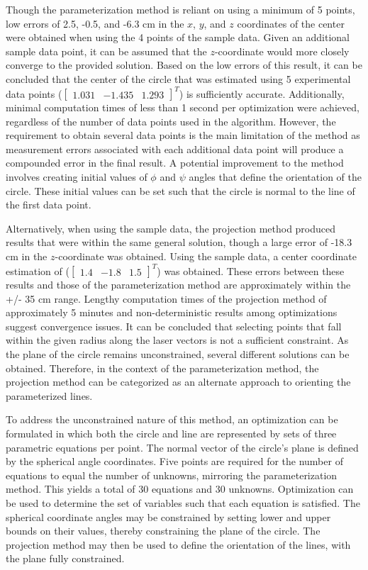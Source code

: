 \documentclass[12pt]{article}
\begin{document}
Though the parameterization method is reliant on using a minimum of 5 points, low errors of 2.5, -0.5, and -6.3 cm in the $x$,  $y$, and $z$ coordinates of the center were obtained when using the 4 points of the sample data.  Given an additional sample data point, it can be assumed that the $z$-coordinate would more closely converge to the provided solution.  Based on the low errors of this result, it can be concluded that the center of the circle that was estimated using 5 experimental data points ($\begin{bmatrix} 1.031 & -1.435  & 1.293 \end{bmatrix}^T$) is sufficiently accurate. Additionally, minimal computation times of less than 1 second per optimization were achieved, regardless of the number of data points used in the algorithm. However, the requirement to obtain several data points is the main limitation of the method as measurement errors associated with each additional data point will produce a compounded error in the final result. A potential improvement to the method involves creating initial values of $\phi$ and $\psi$ angles that define the orientation of the circle.  These initial values can be set such that the circle is normal to the line of the first data point.  

Alternatively, when using the sample data, the projection method produced results that were within the same general solution, though a large error of -18.3 cm in the $z$-coordinate was obtained. Using the sample data, a center coordinate estimation of ($\begin{bmatrix} 1.4 & -1.8  & 1.5 \end{bmatrix}^T$) was obtained. These errors between these results and those of the parameterization method are approximately within the +/- 35 cm range. Lengthy computation times of the projection method of approximately 5 minutes and non-deterministic results among optimizations suggest convergence issues. It can be concluded that selecting points that fall within the given radius along the laser vectors is not a sufficient constraint. As the plane of the circle remains unconstrained, several different solutions can be obtained. Therefore, in the context of the parameterization method, the projection method can be categorized as an alternate approach to orienting the parameterized lines.

To address the unconstrained nature of this method, an optimization can be formulated in which both the circle and line are represented by sets of three parametric equations per point. The normal vector of the circle's plane is defined by the spherical angle coordinates. Five points are required for the number of equations to equal the number of unknowns, mirroring the parameterization method. This yields a total of $30$ equations and $30$ unknowns. Optimization can be used to determine the set of variables such that each equation is satisfied. The spherical coordinate angles may be constrained by setting lower and upper bounds on their values, thereby constraining the plane of the circle.  The projection method may then be used to define the orientation of the lines, with the plane fully constrained. 
\end{document}
